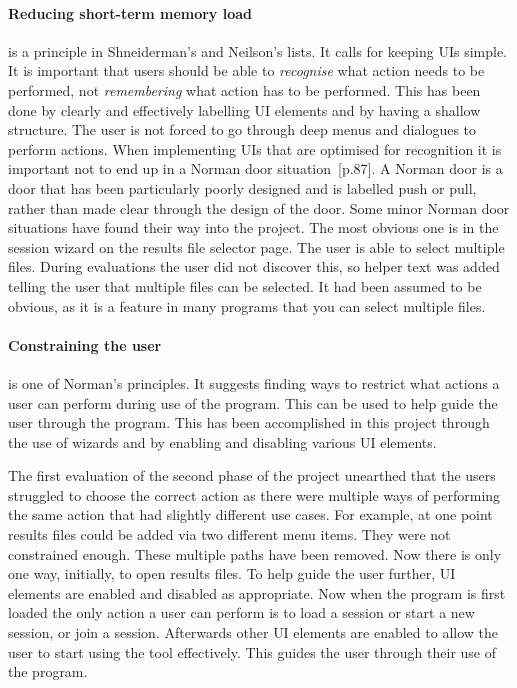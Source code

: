 \paragraph*{Reducing short-term memory load} is a principle in Shneiderman's and Neilson's lists.  It calls for keeping \acp{UI} simple.  It is important that users should be able to \textit{recognise} what action needs to be performed, not \textit{remembering} what action has to be performed.  This has been done by clearly and effectively labelling \ac{UI} elements and by having a shallow structure.  The user is not forced to go through deep menus and dialogues to perform actions.  When implementing \acp{UI} that are optimised for recognition it is important not to end up in a Norman door situation~\cite{design_of_things}[p.87].  A Norman door is a door that has been particularly poorly designed and is labelled push or pull, rather than made clear through the design of the door.  Some minor Norman door situations have found their way into the project.  The most obvious one is in the session wizard on the results file selector page.  The user is able to select multiple files.  During evaluations the user did not discover this, so helper text was added telling the user that multiple files can be selected.  It had been assumed to be obvious, as it is a feature in many programs that you can select multiple files.

\paragraph*{Constraining the user} is one of Norman's principles.  It suggests finding ways to restrict what actions a user can perform during use of the program.  This can be used to help guide the user through the program.  This has been accomplished in this project through the use of wizards and by enabling and disabling various \ac{UI} elements.

The first evaluation of the second phase of the project unearthed that the users struggled to choose the correct action as there were multiple ways of performing the same action that had slightly different use cases.  For example, at one point results files could be added via two different menu items.  They were not constrained enough.  These multiple paths have been removed. Now there is only one way, initially, to open results files.  To help guide the user further, \ac{UI} elements are enabled and disabled as appropriate.  Now when the program is first loaded the only action a user can perform is to load a session or start a new session, or join a session.  Afterwards other \ac{UI} elements are enabled to allow the user to start using the tool effectively.  This guides the user through their use of the program.

